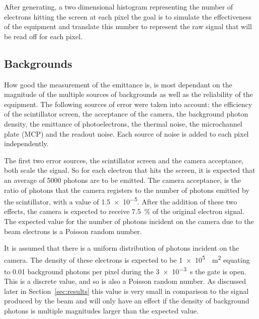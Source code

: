 After generating, a two dimensional histogram representing the number of
electrons hitting the screen at each pixel the goal is to simulate the
effectiveness of the equipment and translate this number to represent the raw
signal that will be read off for each pixel.

\subsection{Backgrounds}

How good the measurement of the emittance is, is most dependant on the magnitude
of the multiple sources of backgrounds as well as the reliability of the
equipment. The following sources of error were taken into account: the
efficiency of the scintillator screen, the acceptance of the camera, the
background photon density, the emittance of photoelectrons, the thermal noise,
the microchannel plate (MCP) and the readout noise. Each source of noise is
added to each pixel independently.


The first two error sources, the scintillator screen and the camera acceptance,
both scale the signal. So for each electron that hits the screen, it is
expected that an average of \num{5000} \cite{} photons are to be emitted. The
camera acceptance, is the ratio of photons that the camera registers to the
number of photons emitted by the scintillator, with a value of \num{1.5e-5}.
After the addition of these two effects, the camera is expected to receive
\SI{7.5}{\percent} of the original electron signal. The expected value for the
number of photons incident on the camera due to the beam electrons is a Poisson
random number.

It is assumed that there is a uniform distribution of photons incident on the
camera. The density of these electrons is expected to be
\SI{1e5}{\per\meter\squared} equating to \num{0.01} background photons per
pixel during the \SI{3e-3}{\second} the gate is open. This is a discrete
value, and so is also a Poisson random number. As discussed later in
Section~\ref{sec:results} this value is very small in comparison to the signal
produced by the beam and will only have an effect if the density of background
photons is multiple magnitudes larger than the expected value.

